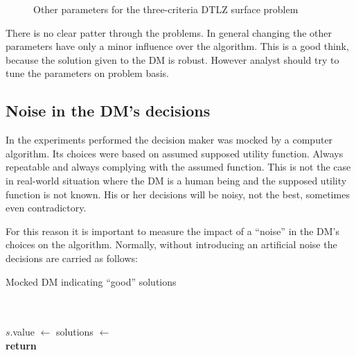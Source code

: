 \begin{figure}
{{    }
  }
  \caption{Other parameters for the three-criteria DTLZ surface problem}
  \label{params2}
\end{figure}

There is no clear patter through the problems. In general changing the other
parameters have only a minor influence over the algorithm. This is a good
think, because the solution given to the DM is robust. However analyst should
try to tune the parameters on problem basis. 

\subsection{Noise in the DM's decisions}

In the experiments performed the decision maker was mocked by a computer
algorithm. Its choices were based on assumed supposed utility function. Always
repeatable and always complying with the assumed function. This is not the
case in real-world situation where the DM is a human being and the supposed
utility function is not known. His or her decisions will be noisy, not the
best, sometimes even contradictory.

For this reason it is important to measure the impact of a ``noise'' in the
DM's choices on the algorithm. Normally, without introducing an artificial
noise the decisions are carried as follows:

\begin{algorithm}
\caption{Mocked DM indicating ``good'' solutions}\label{alg:dmselection}
  \begin{algorithmic}[1]
     \\
     \\
    \State $s.$value $\gets$ 
    \EndFor
    \State solutions $\gets$  \\
    \State \textbf{return} 
    \EndProcedure
  \end{algorithmic}
\end{algorithm}

